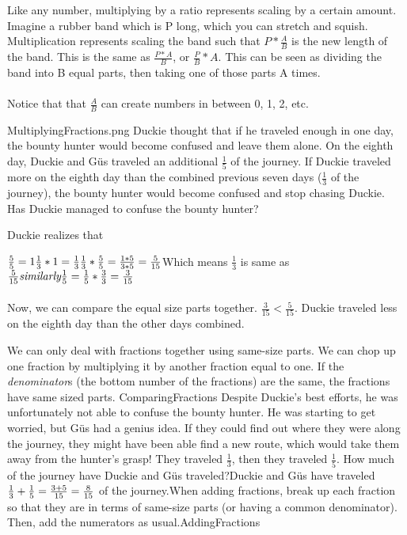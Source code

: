 {Like any number, multiplying by a ratio represents scaling by a certain amount. Imagine a rubber band which is P long, which you can stretch and squish. Multiplication represents scaling the band such that $P\ast\frac{A}{B}$ is the new length of the band. This is the same as $\frac{P\ast A}{B}$, or $\frac{P}{B}\ast A$. This can be seen as dividing the band into B equal parts, then taking one of those parts A times. \paragraph{} Notice that that $\frac{A}{B}$ can create numbers in between 0, 1, 2, etc.}{MultiplyingFractions.png}
{Duckie thought that if he traveled enough in one day, the bounty hunter would become confused and leave them alone. On the eighth day, Duckie and Güs traveled an additional $\frac{1}{5}$ of the journey. If Duckie traveled more on the eighth day than the combined previous seven days ($\frac{1}{3}$ of the journey), the bounty hunter would become confused and stop chasing Duckie. Has Duckie managed to confuse the bounty hunter?}{Duckie realizes that \begin{center}
    $\frac{5}{5}=1 \linebreak
    \frac{1}{3}\ast 1 = \frac{1}{3} \linebreak
    \frac{1}{3}\ast\frac{5}{5} = \frac{1\ast 5}{3\ast 5} = \frac{5}{15}\linebreak  $Which means $\frac{1}{3}$  is same as  $\frac{5}{15} \linebreak\linebreak
    \textit{similarly}
    \frac{1}{5} = \frac{1}{5}\ast\frac{3}{3} = \frac{3}{15}$
\end{center}
\paragraph{} Now, we can compare the equal size parts together. $\frac{3}{15} < \frac{5}{15}$. Duckie traveled less on the eighth day than the other days combined.}{We can only deal with fractions together using same-size parts. We can chop up one fraction by multiplying it by another fraction equal to one. If the \textit{denominator}s (the bottom number of the fractions) are the same, the fractions have same sized parts.}
{ComparingFractions}
{Despite Duckie's best efforts, he was unfortunately not able to confuse the bounty hunter. He was starting to get worried, but Güs had a genius idea. If they could find out where they were along the journey, they might have been able find a new route, which would take them away from the hunter's grasp! They traveled $\frac{1}{3}$, then they traveled $\frac{1}{5}$. How much of the journey have Duckie and Güs traveled?}{Duckie and Güs have traveled
$\frac{1}{3}+\frac{1}{5}\linebreak=\frac{3+5}{15}\linebreak=\frac{8}{15}$ of the journey.}{When adding fractions, break up each fraction so that they are in terms of same-size parts (or having a common denominator). Then, add the numerators as usual.}{AddingFractions}
